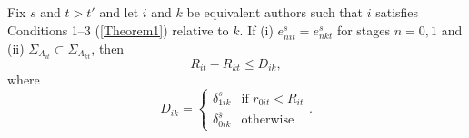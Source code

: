 \begin{corollary}\label{Corollary1}
	Fix $s$ and $t>t'$ and let $i$ and $k$ be equivalent authors such that $i$ satisfies Conditions 1--3 (\autoref{Theorem1}) relative to $k$. If (i) $e_{nit}^s=e_{nkt}^s$ for stages $n=0,1$ and (ii) $\Sigma_{A_{it}}\subset\Sigma_{A_{kt}}$, then
	\begin{equation}\label{equation11}
		R_{it}-R_{kt} \le D_{ik},
	\end{equation}
	where
	\begin{equation*}
		D_{ik} = \begin{cases}
			\delta_{1ik}^s	& \text{if } r_{0it}<R_{it} \\ 
		 	\delta_{0ik}^{\overline s}	& \text{otherwise} \end{cases}.
	\end{equation*}
\end{corollary}